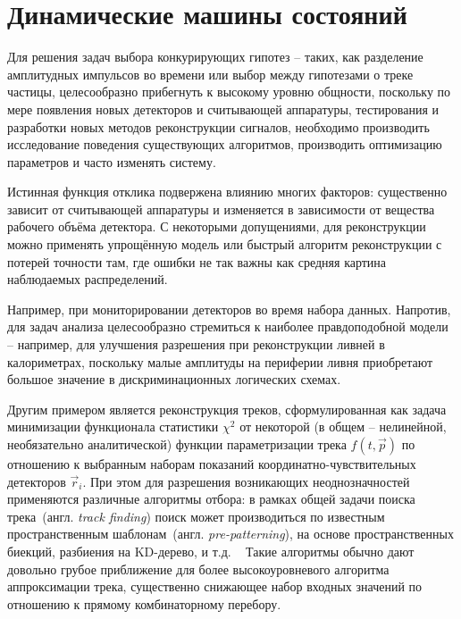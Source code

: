 \section{Динамические машины состояний}

Для решения задач выбора конкурирующих гипотез -- таких, как разделение
амплитудных импульсов во времени или выбор между гипотезами о
треке частицы,
целесообразно прибегнуть к высокому уровню общности,
поскольку по мере появления новых детекторов и считывающей аппаратуры,
тестирования и разработки новых методов реконструкции сигналов,
необходимо производить исследование поведения существующих алгоритмов,
производить оптимизацию параметров и часто изменять систему.

Истинная функция отклика подвержена влиянию многих факторов: существенно
зависит от считывающей аппаратуры и изменяется в зависимости от вещества
рабочего объёма детектора.
С некоторыми допущениями, для реконструкции
можно применять упрощённую модель или быстрый алгоритм реконструкции с
потерей точности там, где ошибки не так важны как средняя картина
наблюдаемых распределений.

Например, при
мониторировании детекторов во время набора данных.
Напротив, для задач анализа целесообразно
стремиться к наиболее правдоподобной модели -- например, для улучшения
разрешения при реконструкции ливней в калориметрах, поскольку
малые амплитуды на периферии ливня приобретают большое значение
в дискриминационных логических схемах.

Другим примером является реконструкция треков, сформулированная
как задача минимизации функционала статистики
$\chi^2$ %
от некоторой (в общем -- нелинейной, необязательно аналитической)
функции параметризации
трека $f(t,\vec{p})$ по отношению к выбранным наборам показаний
координатно-чувствительных детекторов $\vec{r}_i$. При этом
для разрешения возникающих неоднозначностей применяются различные
алгоритмы отбора: в рамках общей задачи поиска трека~(англ. \emph{track finding})
поиск может производиться по известным пространственным
шаблонам~(англ. \emph{pre-patterning}),
на основе пространственных биекций,
разбиения на KD-дерево, и т.д. ~\cite{MankelTracking, artificial-retina-tracking-lhc}
Такие алгоритмы обычно дают довольно грубое
приближение для более высокоуровневого алгоритма аппроксимации трека,
существенно снижающее набор входных значений по отношению к прямому
комбинаторному перебору.

